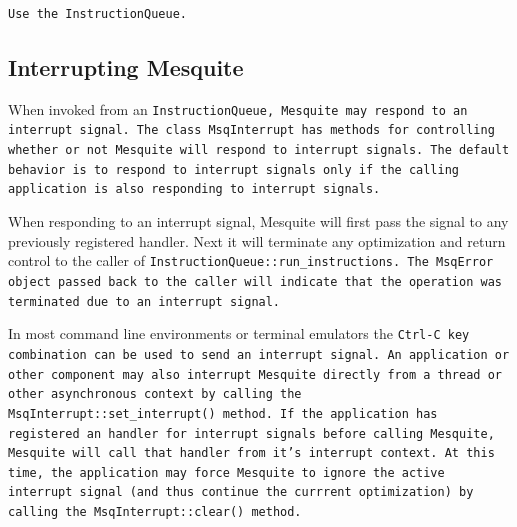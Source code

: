 \begin{verbatim}
Use the InstructionQueue. 
\end{verbatim}

\subsection{Interrupting Mesquite} \label{sec:Ctrl-C}

When invoked from an \tt{InstructionQueue}, Mesquite may respond to 
an interrupt signal.  
The class \tt{MsqInterrupt} has methods for controlling whether or not
Mesquite will respond to interrupt signals.  The default behavior is
to respond to interrupt signals only if the calling application is also
responding to interrupt signals.  

When responding to an interrupt signal,
Mesquite will first pass the signal to any previously
registered handler.  Next it will terminate any optimization and
return control to the caller of \tt{InstructionQueue::run\_instructions}.  
The \tt{MsqError} object 
passed back to the caller will indicate that the operation was terminated
due to an interrupt signal.

In most command line 
environments or terminal emulators the \tt{Ctrl-C} key combination can
be used to send an interrupt signal.  An application or other 
component may also interrupt Mesquite directly from a thread or other
asynchronous context by calling the \tt{MsqInterrupt::set\_interrupt()}
method.  If the application has registered an handler for interrupt 
signals before calling Mesquite, Mesquite will call that handler from
it's interrupt context.  At this time, the application may force Mesquite
to ignore the active interrupt signal (and thus continue the currrent
optimization) by calling the \tt{MsqInterrupt::clear()}
method.





